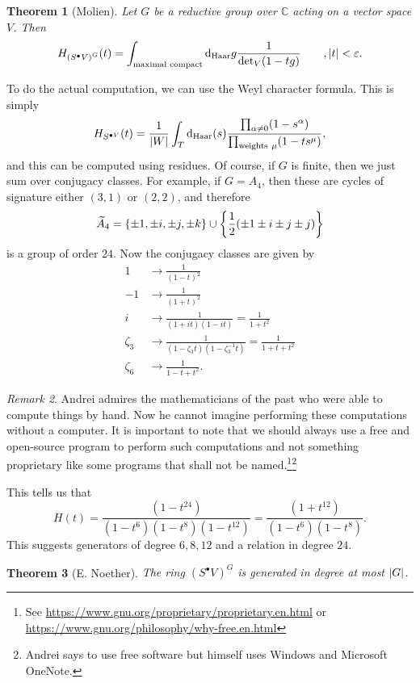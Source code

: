 \documentclass[leqno, openany]{memoir}
\newtheorem{thm}{Theorem}[section]
\theoremstyle{definition}
\theoremstyle{remark}
\newtheorem{rmk}[thm]{Remark}
\theoremstyle{plain}
\theoremstyle{definition}
\theoremstyle{remark}
\newcommand{\C}{\mathbb{C}}
\newcommand{\ep}{\varepsilon}
\newcommand{\mr}[1]{\mathrm{#1}}
\newcommand{\wtl}[1]{\widetilde{#1}}
\begin{document}
\begin{thm}[Molien]
    Let $G$ be a reductive group over $\C$ acting on a vector space $V$. Then
    \[ H_{{(S^{\bullet} V)}^G}(t) = \int_{\text{maximal compact}} \dd_{\mr{Haar}}g \frac{1}{\det_V(1-tg)} \qquad, \abs{t} < \ep. \]
\end{thm}

To do the actual computation, we can use the Weyl character formula. This is simply
\[ H_{S^{\bullet V}}(t) = \frac{1}{\abs{W}} \int_T \dd_{\mr{Haar}}(s) \frac{\prod_{\alpha \neq 0} (1-s^{\alpha})}{\prod_{\text{weights}\ \mu} (1 - ts^{\mu})}, \]
and this can be computed using residues. Of course, if $G$ is finite, then we just sum over conjugacy classes. For example, if $G = A_4$, then these are cycles of signature either $(3,1)$ or $(2,2)$, and therefore
\[ \wtl{A}_4 = \qty{\pm 1, \pm i, \pm j, \pm k} \cup \qty{\frac{1}{2}(\pm 1 \pm i \pm j \pm j)} \]
is a group of order $24$. Now the conjugacy classes are given by
\begin{align*}
    1 &\longrightarrow \frac{1}{{(1-t)}^2} \\
    -1 &\longrightarrow \frac{1}{{(1+t)}^2} \\
    i &\longrightarrow \frac{1}{(1+it)(1-it)} = \frac{1}{1+t^2} \\
    \zeta_3 &\longrightarrow \frac{1}{(1-\zeta_3 t)(1-\zeta_3^{-1}t)} = \frac{1}{1+t+t^2} \\
    \zeta_6 &\longrightarrow \frac{1}{1-t+t^2}.
\end{align*}

\begin{rmk}
    Andrei admires the mathematicians of the past who were able to compute things by hand. Now he cannot imagine performing these computations without a computer. It is important to note that we should always use a free and open-source program to perform such computations and not something proprietary like some programs that shall not be named.\footnote{See \url{https://www.gnu.org/proprietary/proprietary.en.html} or \url{https://www.gnu.org/philosophy/why-free.en.html}}\footnote{Andrei says to use free software but himself uses Windows and Microsoft OneNote.}
\end{rmk}

This tells us that 
\[ H(t) = \frac{(1-t^{24})}{(1-t^6)(1-t^8)(1-t^{12})} = \frac{(1+t^{12})}{(1-t^6)(1-t^8)}. \]
This suggests generators of degree $6,8,12$ and a relation in degree $24$.

\begin{thm}[E. Noether]
    The ring ${(S^{\bullet}V)}^G$ is generated in degree at most $\abs{G}$.
\end{thm}
\end{document}
